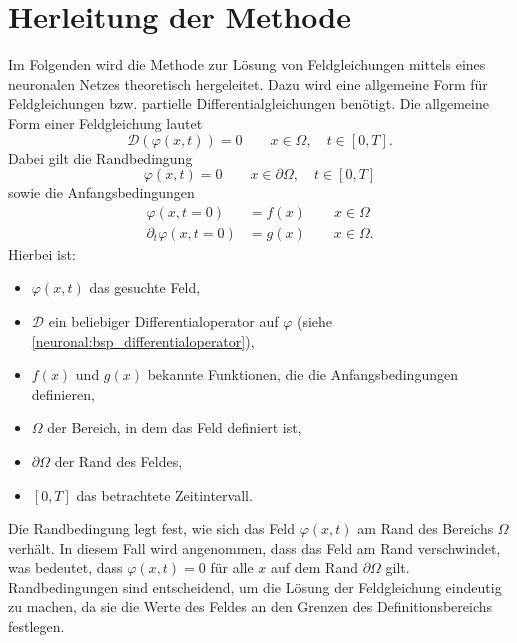 %
%
%
%

\section{Herleitung der Methode\label{neuronal:section:herleitung}}

Im Folgenden wird die Methode zur Lösung von Feldgleichungen mittels eines neuronalen Netzes theoretisch hergeleitet.
Dazu wird eine allgemeine Form für Feldgleichungen bzw. partielle Differentialgleichungen benötigt.
Die allgemeine Form einer Feldgleichung lautet
\begin{equation}
\mathcal{D}(\varphi(x, t)) = 0 \qquad x \in \Omega, \quad t \in [0,T].
\label{neuronal:generelle_feldgleichung}
\end{equation}
Dabei gilt die Randbedingung
\begin{equation}
\varphi(x, t) = 0 \qquad x \in \partial \Omega, \quad t \in [0,T]
\end{equation}
sowie die Anfangsbedingungen
\begin{equation}
    \begin{aligned}
        \varphi(x, t = 0) &= f(x) \qquad x \in \Omega \\
        \partial_t \varphi(x, t = 0) &= g(x) \qquad x \in \Omega.
    \end{aligned}
\end{equation}
Hierbei ist:
\begin{itemize}
    \item $\varphi(x, t)$ das gesuchte Feld,
    \item $\mathcal{D}$ ein beliebiger Differentialoperator auf $\varphi$ (siehe \eqref{neuronal:bsp_differentialoperator}),
    \item $f(x)$ und $g(x)$ bekannte Funktionen, die die Anfangsbedingungen definieren,
    \item $\Omega$ der Bereich, in dem das Feld definiert ist,
    \item $\partial \Omega$ der Rand des Feldes,
    \item $[0,T]$ das betrachtete Zeitintervall.
\end{itemize}

Die Randbedingung legt fest, wie sich das Feld $\varphi(x, t)$ am Rand des Bereichs $\Omega$ verhält.
In diesem Fall wird angenommen, dass das Feld am Rand verschwindet, was bedeutet, dass $\varphi(x, t) = 0$ für alle $x$ auf dem Rand $\partial \Omega$ gilt.
Randbedingungen sind entscheidend, um die Lösung der Feldgleichung eindeutig zu machen, da sie die Werte des Feldes an den Grenzen des Definitionsbereichs festlegen.


